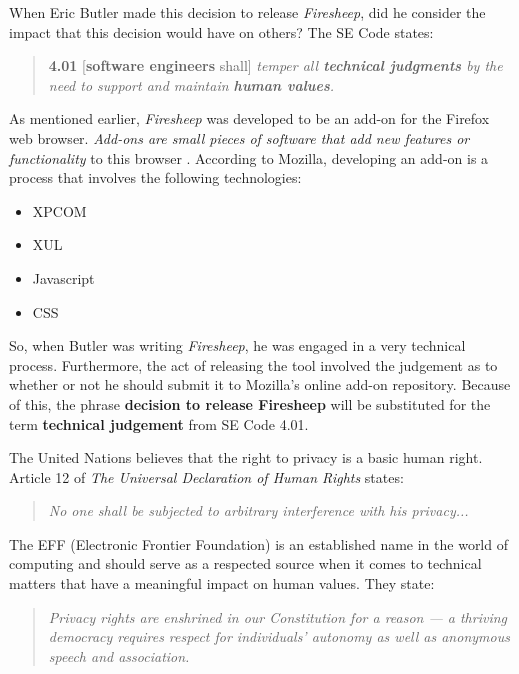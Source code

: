 \documentclass[11pt]{article}
\begin{document}
\begin{multicols}{2}
When Eric Butler made this decision to release \emph{Firesheep}, did he consider the impact that this decision would have on others? The SE Code states:


\begin{quote}
\textbf{4.01} [\textbf{software engineers} shall] \emph{temper all \textbf{technical judgments} by the need to support and maintain \textbf{human values}.} \cite{se_code}
\end{quote}

As mentioned earlier, \emph{Firesheep} was developed to be an add-on for the Firefox web browser. \emph{Add-ons are small pieces of software that add new features or functionality} to this browser \cite{about_addons}. According to Mozilla, developing an add-on is a process that involves the following technologies: \cite{making_addons}

\begin{itemize}
  \item XPCOM
  \item XUL
  \item Javascript
  \item CSS
\end{itemize}

So, when Butler was writing \emph{Firesheep}, he was engaged in a very technical process. Furthermore, the act of releasing the tool involved the judgement as to whether or not he should submit it to Mozilla's online add-on repository. Because of this, the phrase \textbf{decision to release Firesheep} will be substituted for the term \textbf{technical judgement} from SE Code 4.01.

The United Nations believes that the right to privacy is a basic human right. Article 12 of \emph{The Universal Declaration of Human Rights} states:

\begin{quote}
  \emph{No one shall be subjected to arbitrary interference with his privacy...} \cite{un_rights}
\end{quote}

The EFF (Electronic Frontier Foundation) is an established name in the world of computing and should serve as a respected source when it comes to technical matters that have a meaningful impact on human values. They state:

\begin{quote}
  \emph{Privacy rights are enshrined in our Constitution for a reason — a thriving democracy requires respect for individuals' autonomy as well as anonymous speech and association.} \cite{eff_privacy}
\end{quote}


\end{multicols}
\end{document}

